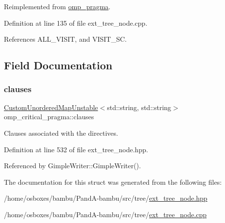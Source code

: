 Reimplemented from \hyperlink{structomp__pragma_a2e2c445528b7e097ae76fa618a9970b5}{omp\+\_\+pragma}.



Definition at line 135 of file ext\+\_\+tree\+\_\+node.\+cpp.



References A\+L\+L\+\_\+\+V\+I\+S\+IT, and V\+I\+S\+I\+T\+\_\+\+SC.



\subsection{Field Documentation}
\mbox{\label{structomp__critical__pragma_afdd57d5aa2baa00cf8abd89ff5cd9f83}} 
\subsubsection{\texorpdfstring{clauses}{clauses}}
{\footnotesize\ttfamily \hyperlink{custom__map_8hpp_a8cbaceffc09790a885ec7e9c17809c69}{Custom\+Unordered\+Map\+Unstable}$<$std\+::string, std\+::string$>$ omp\+\_\+critical\+\_\+pragma\+::clauses}



Clauses associated with the directives. 



Definition at line 532 of file ext\+\_\+tree\+\_\+node.\+hpp.



Referenced by Gimple\+Writer\+::\+Gimple\+Writer().



The documentation for this struct was generated from the following files\+:\begin{DoxyCompactItemize}
\item 
/home/osboxes/bambu/\+Pand\+A-\/bambu/src/tree/\hyperlink{ext__tree__node_8hpp}{ext\+\_\+tree\+\_\+node.\+hpp}\item 
/home/osboxes/bambu/\+Pand\+A-\/bambu/src/tree/\hyperlink{ext__tree__node_8cpp}{ext\+\_\+tree\+\_\+node.\+cpp}\end{DoxyCompactItemize}
